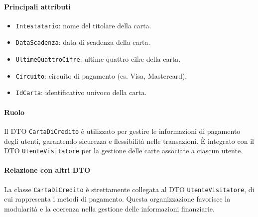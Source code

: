 \paragraph{Principali attributi}
\begin{itemize}
    \item \texttt{Intestatario}: nome del titolare della carta.
    \item \texttt{DataScadenza}: data di scadenza della carta.
    \item \texttt{UltimeQuattroCifre}: ultime quattro cifre della carta.
    \item \texttt{Circuito}: circuito di pagamento (es. Visa, Mastercard).
    \item \texttt{IdCarta}: identificativo univoco della carta.
\end{itemize}

\paragraph{Ruolo}
Il DTO \texttt{CartaDiCredito} è utilizzato per gestire le informazioni di pagamento degli utenti, garantendo sicurezza e flessibilità nelle transazioni. È integrato con il DTO \texttt{UtenteVisitatore} per la gestione delle carte associate a ciascun utente.

\paragraph{Relazione con altri DTO}
La classe \texttt{CartaDiCredito} è strettamente collegata al DTO \texttt{UtenteVisitatore}, di cui rappresenta i metodi di pagamento. Questa organizzazione favorisce la modularità e la coerenza nella gestione delle informazioni finanziarie.